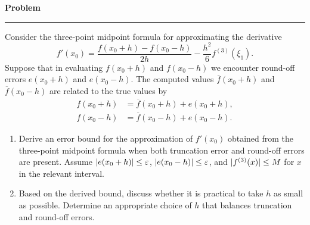 \documentclass[11pt, a4paper]{article}
\newcommand{\eps}{\varepsilon}
\DeclarePairedDelimiter\abs{\lvert}{\rvert}
\newenvironment{problem}{%
  \begin{tcolorbox}[
    colback=blue!4!white,
    colframe=blue!38!black,
    boxrule=0.95pt,
    arc=3pt,
    left=11pt,
    right=11pt,
    top=10pt,
    bottom=11pt,
    before skip=12pt,
    after skip=14pt,
  ]
  \noindent\textbf{\textcolor{blue!35!black}{Problem}}\par\nointerlineskip
  {\color{blue!42!black}\rule{\linewidth}{0.55pt}}\par\vspace{0.55em}%
}{%
  \end{tcolorbox}%
}
\begin{document}
    \begin{problem}
        Consider the three-point midpoint formula for approximating the derivative
        \begin{equation*}
        f'(x_0) = \frac{f(x_0+h) - f(x_0-h)}{2h} - \frac{h^2}{6}f^{(3)}(\xi_1).
        \end{equation*}
        Suppose that in evaluating $f(x_0+h)$ and $f(x_0-h)$ we encounter round-off errors $e(x_0+h)$ and $e(x_0-h)$. The computed values $\overline{f}(x_0+h)$ and $\overline{f}(x_0-h)$ are related to the true values by
        \begin{align*}
        f(x_0+h) &= \overline{f}(x_0+h) + e(x_0+h), \\
        f(x_0-h) &= \overline{f}(x_0-h) + e(x_0-h).
        \end{align*}
        \begin{enumerate}[label=(\alph*)]
            \item Derive an error bound for the approximation of $f'(x_0)$ obtained from the three-point midpoint formula when both truncation error and round-off errors are present. Assume $\abs{e(x_0+h)} \le \eps$, $\abs{e(x_0-h)} \le \eps$, and $\abs{f^{(3)}(x)} \le M$ for $x$ in the relevant interval.
            \item Based on the derived bound, discuss whether it is practical to take $h$ as small as possible. Determine an appropriate choice of $h$ that balances truncation and round-off errors.
        \end{enumerate}
        \end{problem}
        
\end{document}
